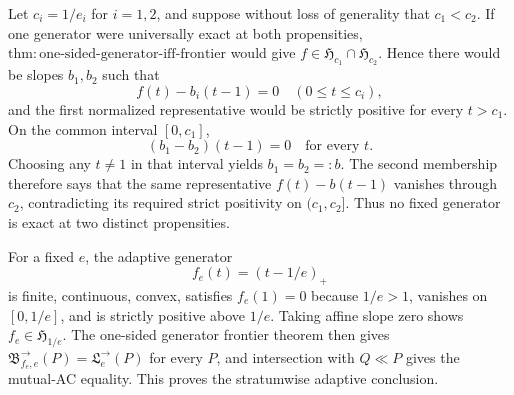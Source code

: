 Let \(c_i=1/e_i\) for \(i=1,2\), and suppose without loss of generality that \(c_1<c_2\).  If one generator were universally exact at both propensities, \(\mathrm{thm:one\text{-}sided\text{-}generator\text{-}iff\text{-}frontier}\) would give \(f\in\mathfrak H_{c_1}\cap\mathfrak H_{c_2}\).  Hence there would be slopes \(b_1,b_2\) such that
\[
 f(t)-b_i(t-1)=0\quad(0\le t\le c_i),
\]
and the first normalized representative would be strictly positive for every \(t>c_1\).  On the common interval \([0,c_1]\),
\[
 (b_1-b_2)(t-1)=0\quad\text{for every }t.
\]
Choosing any \(t\ne1\) in that interval yields \(b_1=b_2=:b\).  The second membership therefore says that the same representative \(f(t)-b(t-1)\) vanishes through \(c_2\), contradicting its required strict positivity on \((c_1,c_2]\).  Thus no fixed generator is exact at two distinct propensities.

For a fixed \(e\), the adaptive generator
\[
 f_e(t)=(t-1/e)_+
\]
is finite, continuous, convex, satisfies \(f_e(1)=0\) because \(1/e>1\), vanishes on \([0,1/e]\), and is strictly positive above \(1/e\).  Taking affine slope zero shows \(f_e\in\mathfrak H_{1/e}\).  The one-sided generator frontier theorem then gives \(\mathfrak B^{\to}_{f_e,e}(P)=\mathfrak L^{\to}_e(P)\) for every \(P\), and intersection with \(Q\ll P\) gives the mutual-AC equality.  This proves the stratumwise adaptive conclusion.